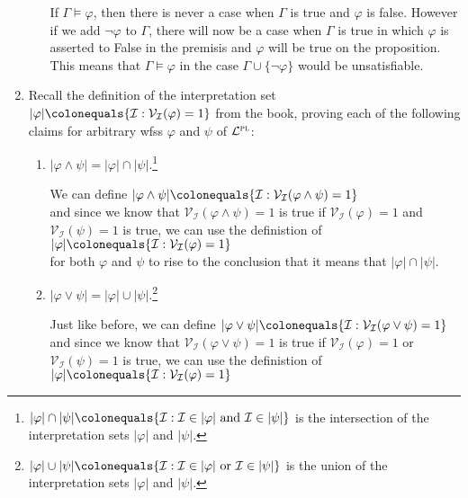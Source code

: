 \documentclass[12pt]{article}
\renewcommand{\vert}[1]{\lvert#1\rvert}
\newcommand{\set}[1]{\lbrace#1\rbrace} %
\newcommand{\I}{\mathcal{I}} %
\newcommand{\PL}{\mathcal{L}^{\textsc{pl}}} %
\newcommand{\V}[1]{\mathcal{V}_{#1}} %
\newcommand{\answer}[1]{%
  \par\noindent
  \begin{tcolorbox}[colback=gray!10, colframe=gray!80, title=Proof]
    #1
  \end{tcolorbox}
}
\begin{document}
\begin{enumerate}
\begin{enumerate}
{          %

          If $\Gamma \vDash \varphi$, then there is never a case when $\Gamma$ is true and $\varphi$ is false.
          However if we add $\lnot \varphi$ to $\Gamma$, there will now be a case when $\Gamma$ is true
          in which $\varphi$ is asserted to False in the premisis and $\varphi$ will be true on the proposition.
          This means that $\Gamma \vDash \varphi$ in the case $\Gamma \cup \set{\neg \varphi}$ would be unsatisfiable.
        }
    \end{enumerate}
  
  \item 
    Recall the definition of the interpretation set $\vert{\varphi} \colonequals \set{\I : \V{\I}(\varphi) = 1}$ from the book, proving each of the following claims for arbitrary wfss $\varphi$ and $\psi$ of $\PL$:
    \begin{enumerate}
      \item $\vert{\varphi \wedge \psi} = \vert{\varphi} \cap \vert{\psi}$.\footnote{$\vert{\varphi} \cap \vert{\psi} \colonequals \set{\I : \I \in \vert{\varphi} \text{ and } \I \in \vert{\psi}}$ is the intersection of the interpretation sets $\vert{\varphi}$ and $\vert{\psi}$.}
        \answer{
          We can define $\vert{\varphi \wedge \psi} \colonequals \set{\I : \V{\I}(\varphi \wedge \psi) = 1}$\\
          and since we know that $\V{\I}(\varphi \wedge \psi) = 1$ is true if $\V{\I}(\varphi) = 1$ and
          $\V{\I}(\psi) = 1$ is true, we can use the definistion of $\vert{\varphi} \colonequals \set{\I : \V{\I}(\varphi) = 1}$\\
          for both $\varphi$ and $\psi$ to rise to the conclusion that it means that $\vert{\varphi} \cap \vert{\psi}$.
        }
      \item $\vert{\varphi \vee \psi} = \vert{\varphi} \cup \vert{\psi}$.\footnote{$\vert{\varphi} \cup \vert{\psi} \colonequals \set{\I : \I \in \vert{\varphi} \text{ or } \I \in \vert{\psi}}$ is the union of the interpretation sets $\vert{\varphi}$ and $\vert{\psi}$.}
        \answer{
          Just like before, we can define $\vert{\varphi \vee \psi} \colonequals \set{\I : \V{\I}(\varphi \vee \psi) = 1}$\\
          and since we know that $\V{\I}(\varphi \vee \psi) = 1$ is true if $\V{\I}(\varphi) = 1$ or
          $\V{\I}(\psi) = 1$ is true, we can use the definistion of $\vert{\varphi} \colonequals \set{\I : \V{\I}(\varphi) = 1}$\\
}
\end{enumerate}
\end{enumerate}
\end{document}
